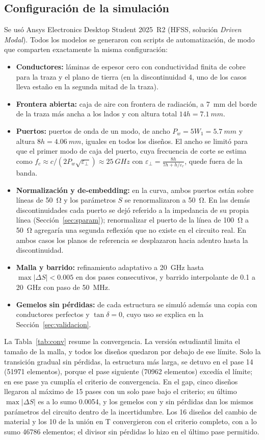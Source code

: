\documentclass[11pt,letterpaper]{article}
\begin{document}
\subsection{Configuración de la simulación}
\label{sec:config}
Se usó Ansys Electronics Desktop Student 2025~R2 (HFSS, solución \emph{Driven Modal}). Todos los modelos se generaron con scripts de automatización, de modo que comparten exactamente la misma configuración:
\begin{itemize}
\item \textbf{Conductores:} láminas de espesor cero con conductividad finita de cobre para la traza y el plano de tierra (en la discontinuidad 4, uno de los casos lleva estaño en la segunda mitad de la traza).
\item \textbf{Frontera abierta:} caja de aire con frontera de radiación, a \SI{7}{mm} del borde de la traza más ancha a los lados y con altura total $14h=\SI{7.1}{mm}$.
\item \textbf{Puertos:} puertos de onda de un modo, de ancho $P_w=5W_1=\SI{5.7}{mm}$ y altura $8h=\SI{4.06}{mm}$, iguales en todos los diseños. El ancho se limitó para que el primer modo de caja del puerto, cuya frecuencia de corte se estima como $f_c\approx c/\left(2P_w\sqrt{\varepsilon_\perp}\right)\approx\SI{25}{GHz}$ con $\varepsilon_\perp=\frac{8h}{7h+h/\varepsilon_r}$, quede fuera de la banda.
\item \textbf{Normalización y de-embedding:} en la curva, ambos puertos están sobre líneas de \SI{50}{\ohm} y los parámetros $S$ se renormalizaron a \SI{50}{\ohm}. En las demás discontinuidades cada puerto se dejó referido a la impedancia de su propia línea (Sección~\ref{sec:sparam}); renormalizar el puerto de la línea de \SI{100}{\ohm} a \SI{50}{\ohm} agregaría una segunda reflexión que no existe en el circuito real. En ambos casos los planos de referencia se desplazaron hacia adentro hasta la discontinuidad.
\item \textbf{Malla y barrido:} refinamiento adaptativo a \SI{20}{GHz} hasta $\max|\Delta S|<0.005$ en dos pases consecutivos, y barrido interpolante de \SI{0.1}{} a \SI{20}{GHz} con paso de \SI{50}{MHz}.
\item \textbf{Gemelos sin pérdidas:} de cada estructura se simuló además una copia con conductores perfectos y $\tan\delta=0$, cuyo uso se explica en la Sección~\ref{sec:validacion}.
\end{itemize}
La Tabla~\ref{tab:conv} resume la convergencia. La versión estudiantil limita el tamaño de la malla, y todos los diseños quedaron por debajo de ese límite. Solo la transición gradual sin pérdidas, la estructura más larga, se detuvo en el pase 14 (\num{51971} elementos), porque el pase siguiente (\num{70962} elementos) excedía el límite; en ese pase ya cumplía el criterio de convergencia. En el gap, cinco diseños llegaron al máximo de 15 pases con un solo pase bajo el criterio; su último $\max|\Delta S|$ es a lo sumo 0.0054, y los gemelos con y sin pérdidas dan los mismos parámetros del circuito dentro de la incertidumbre. Los 16 diseños del cambio de material y los 10 de la unión en T convergieron con el criterio completo, con a lo sumo \num{46786} elementos; el divisor sin pérdidas lo hizo en el último pase permitido.
\end{document}
